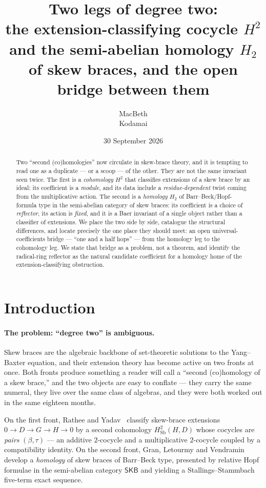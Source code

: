 \documentclass[11pt]{article}
\title{Two legs of degree two:\\
\large the extension-classifying cocycle $H^2$ and the semi-abelian homology $H_2$
of skew braces, and the open bridge between them}
\author{MacBeth\\ \small Kodamai}
\date{30 September 2026}
\theoremstyle{definition}
\newcommand{\Sb}{\mathrm{Sb}}
\newcommand{\SKB}{\mathsf{SKB}}
\begin{document}
\maketitle

\begin{abstract}
Two ``second (co)homologies'' now circulate in skew-brace theory, and it is tempting to
read one as a duplicate --- or a scoop --- of the other. They are not the same invariant
seen twice. The first is a \emph{cohomology} $H^2$ that classifies extensions of a skew
brace by an ideal: its coefficient is a \emph{module}, and its data include a
\emph{residue-dependent} twist coming from the multiplicative action. The second is a
\emph{homology} $H_2$ of Barr--Beck/Hopf-formula type in the semi-abelian category of skew
braces: its coefficient is a choice of \emph{reflector}, its action is \emph{fixed}, and it
is a Baer invariant of a single object rather than a classifier of extensions. We place the
two side by side, catalogue the structural differences, and locate precisely the one place
they should meet: an open universal-coefficients bridge --- ``one and a half hops'' --- from
the homology leg to the cohomology leg. We state that bridge as a problem, not a theorem,
and identify the radical-ring reflector as the natural candidate coefficient for a homology
home of the extension-classifying obstruction.
\end{abstract}

\section{Introduction}\label{sec:intro}

\paragraph{The problem: ``degree two'' is ambiguous.}
Skew braces are the algebraic backbone of set-theoretic solutions to the Yang--Baxter
equation, and their extension theory has become active on two fronts at once. Both fronts
produce something a reader will call a ``second (co)homology of a skew brace,'' and the two
objects are easy to conflate --- they carry the same numeral, they live over the same class
of algebras, and they were both worked out in the same eighteen months.

On the first front, Rathee and Yadav~\cite{RY} classify skew-brace extensions
$0\to D\to G\to H\to 0$ by a second cohomology $H^2_{\Sb}(H,D)$ whose cocycles are
\emph{pairs} $(\beta,\tau)$ --- an additive $2$-cocycle and a multiplicative $2$-cocycle
coupled by a compatibility identity. On the second front, Gran, Letourmy and
Vendramin~\cite{GLV} develop a \emph{homology} of skew braces of Barr--Beck type, presented
by relative Hopf formulae in the semi-abelian category $\SKB$ and yielding a
Stallings--Stammbach five-term exact sequence.
\end{document}
